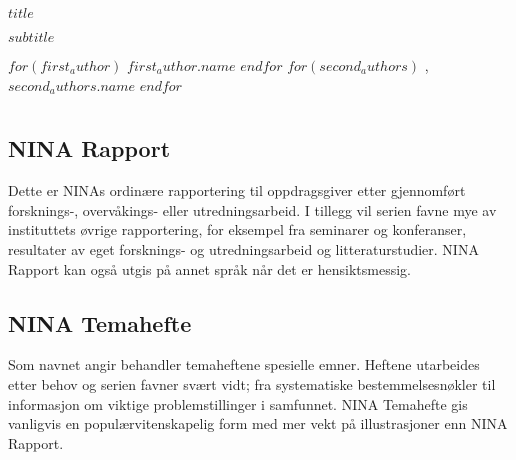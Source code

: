 \documentclass[11pt, a4paper]{article}
\begin{document}

\begin{titlepage}
\thispagestyle{titlefooter}

\Huge{$title$} \par\vspace{.3cm}
\huge{$subtitle$} \par\vspace{.6cm}
$for(first_author)$
\hspace{0cm}\LARGE{$first_author.name$}
$endfor$
$for(second_authors)$
\hspace{-2mm},~\LARGE{$second_authors.name$}
$endfor$
\restoregeometry
\end{titlepage}
\cfoot{}

\section*{}


\subsection*{\small{NINA Rapport}}
{\small Dette er NINAs ordinære rapportering til oppdragsgiver etter gjennomført forsknings\hyp{}, overvåkings\hyp{} eller utredningsarbeid. I tillegg vil serien favne mye av instituttets øvrige rapportering, for eksempel
fra seminarer og konferanser, resultater av eget forsknings\hyp{} og utredningsarbeid og litteraturstudier.
NINA Rapport kan også utgis på annet språk når det er hensiktsmessig.}

\subsection*{\small{NINA Temahefte}}
{\small Som navnet angir behandler temaheftene spesielle emner. Heftene utarbeides etter behov og
serien favner svært vidt; fra systematiske bestemmelsesnøkler til informasjon om viktige
problemstillinger i samfunnet. NINA Temahefte gis vanligvis en populærvitenskapelig form med mer
vekt på illustrasjoner enn NINA Rapport.}
\end{document}
